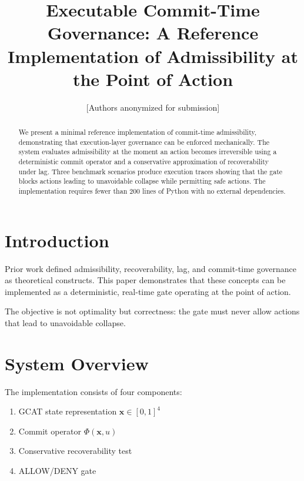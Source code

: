 \documentclass[letterpaper, 10 pt, conference]{ieeeconf}
\title{\bf Executable Commit-Time Governance: A Reference Implementation of Admissibility at the Point of Action}
\author{[Authors anonymized for submission]}
\begin{document}
\maketitle
\thispagestyle{empty}
\pagestyle{empty}

\begin{abstract}
We present a minimal reference implementation of commit-time admissibility, demonstrating that execution-layer governance can be enforced mechanically. The system evaluates admissibility at the moment an action becomes irreversible using a deterministic commit operator and a conservative approximation of recoverability under lag. Three benchmark scenarios produce execution traces showing that the gate blocks actions leading to unavoidable collapse while permitting safe actions. The implementation requires fewer than 200 lines of Python with no external dependencies.
\end{abstract}

\section{Introduction}

Prior work defined admissibility, recoverability, lag, and commit-time governance as theoretical constructs. This paper demonstrates that these concepts can be implemented as a deterministic, real-time gate operating at the point of action.

The objective is not optimality but correctness: the gate must never allow actions that lead to unavoidable collapse.

\section{System Overview}

The implementation consists of four components:

\begin{enumerate}
\item GCAT state representation $\mathbf{x} \in [0,1]^4$
\item Commit operator $\Phi(\mathbf{x},u)$
\item Conservative recoverability test
\item ALLOW/DENY gate
\end{enumerate}
\end{document}
